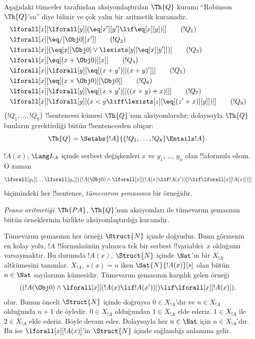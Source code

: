 \documentclass[../../../include/open-logic-section]{subfiles}
\begin{document}
\begin{defn}
Aşağıdaki tümceler tarafından aksiyomlaştırılan $\Th{Q}$ kuramı
``Robinson $\Th{Q}$'su'' diye bilinir ve çok yalın bir aritmetik kuramıdır.
\begin{align*}
& \lforall[x][\lforall[y][(\eq[x'][y'] \lif \eq[x][y])]] \tag{$!Q_1$}\\
& \lforall[x][\eq/[\Obj 0][x']] \tag{$!Q_2$}\\
& \lforall[x][(\eq[x][\Obj 0] \lor \lexists[y][\eq[x][y']])] \tag{$!Q_3$}\\
& \lforall[x][\eq[(x + \Obj 0)][x]] \tag{$!Q_4$}\\
& \lforall[x][\lforall[y][\eq[(x + y')][(x + y)']]] \tag{$!Q_5$}\\
& \lforall[x][\eq[(x \times \Obj 0)][\Obj 0]] \tag{$!Q_6$}\\
& \lforall[x][\lforall[y][\eq[(x \times y')][((x \times y) + x)]]] \tag{$!Q_7$}\\
& \lforall[x][\lforall[y][(x < y \liff \lexists[z][\eq[(z' + x)][y]])]] \tag{$!Q_8$}
\end{align*}
$\{!Q_1, \dots, !Q_8\}$ !!{sentence}s{}i kümesi $\Th{Q}$'nun
aksiyomlarıdır; dolayısıyla $\Th{Q}$ bunların gerektirdiği bütün
!!{sentence}s{}den oluşur:
\[
\Th{Q} = \Setabs{!A}{\{!Q_1, \dots, !Q_8\} \Entails !A}.
\]
\end{defn}

\begin{defn}
$!A(x)$, $\Lang L_A$ içinde serbest değişkenleri $x$ ve $y_1$, \dots,
$y_n$ olan !!a{formula} olsun. O zaman
\[
\lforall[y_1][\dots\lforall[y_n][((!A(\Obj 0) \land \lforall[x][(!A(x)
\lif !A(x'))]) \lif \lforall[x][!A(x)])]]
\]
biçimindeki her !!{sentence}, \emph{tümevarım şemasının} bir örneğidir.

\emph{Peano aritmetiği}~$\Th{PA}$, $\Th{Q}$'nun aksiyomları ile tümevarım
şemasının bütün örneklerinin birlikte aksiyomlaştırdığı kuramdır.
\end{defn}

\begin{explain}
Tümevarım şemasının her örneği $\Struct{N}$ içinde doğrudur. Bunu görmenin
en kolay yolu, $!A$ !!{formula}{}ünün yalnızca tek bir serbest
!!{variable}{}i~$x$ olduğunu varsaymaktır. Bu durumda $!A(x)$,
$\Struct{N}$ içinde $\Nat$'ın bir $X_{!A}$ altkümesini tanımlar.
$X_{!A}$, $s(x) = n$ iken $\Sat{N}{!A(x)}[s]$ olan bütün $n \in \Nat$
sayılarının kümesidir. Tümevarım şemasının karşılık gelen örneği
\[
((!A(\Obj 0) \land \lforall[x][(!A(x) \lif !A(x'))]) \lif 
  \lforall[x][!A(x)]).
\]
olur. Bunun önceli $\Struct{N}$ içinde doğruysa $0 \in X_{!A}$'dır ve
$n \in X_{!A}$ olduğunda $n+1$ de öyledir. $0 \in X_{!A}$
olduğundan $1 \in X_{!A}$ elde ederiz. $1 \in X_{!A}$ ile $2 \in X_{!A}$
elde ederiz. Böyle devam eder. Dolayısıyla her $n \in \Nat$ için
$n \in X_{!A}$'dır. Bu ise $\lforall[x][!A(x)]$'in $\Struct{N}$ içinde
sağlandığı anlamına gelir.
\end{explain}
\end{document}

